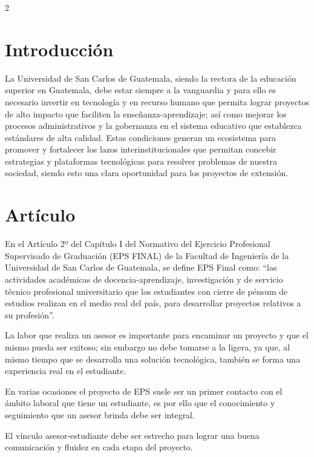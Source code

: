 \documentclass[11pt,spanish,Letterpaper,openany]{book}
\begin{document}
\begin {multicols}{2}

\hypertarget{introduccion-1}{%
\section{Introducción}\label{introduccion-1}}

La Universidad de San Carlos de Guatemala, siendo la rectora de la educación superior en Guatemala, debe estar siempre a la vanguardia y para ello es necesario invertir en tecnología y en recurso humano que permita lograr proyectos de alto impacto que faciliten la enseñanza-aprendizaje; así como mejorar los procesos administrativos y la gobernanza en el sistema educativo que establezca estándares de alta calidad. Estas condiciones generan un ecosistema para promover y fortalecer los lazos interinstitucionales que permitan concebir estrategias y plataformas tecnológicas para resolver problemas de nuestra sociedad, siendo esto una clara oportunidad para los proyectos de extensión.

\hypertarget{articulo}{%
\section{Artículo}\label{articulo}}

En el Artículo 2º del Capítulo I del Normativo del Ejercicio Profesional Supervisado de Graduación (EPS FINAL) de la Facultad de Ingeniería de la Universidad de San Carlos de Guatemala, se define EPS Final como: ``las actividades académicas de docencia-aprendizaje, investigación y de servicio técnico profesional universitario que los estudiantes con cierre de pénsum de estudios realizan en el medio real del país, para desarrollar proyectos relativos a su profesión''.

La labor que realiza un asesor es importante para encaminar un proyecto y que el mismo pueda ser exitoso; sin embargo no debe tomarse a la ligera, ya que, al mismo tiempo que se desarrolla una solución tecnológica, también se forma una experiencia real en el estudiante.

En varias ocasiones el proyecto de EPS suele ser un primer contacto con el ámbito laboral que tiene un estudiante, es por ello que el conocimiento y seguimiento que un asesor brinda debe ser integral.

El vínculo asesor-estudiante debe ser estrecho para lograr una buena comunicación y fluidez en cada etapa del proyecto.


\end{multicols}
\end{document}
